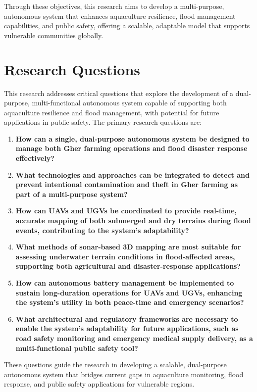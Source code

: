 \documentclass[conference]{IEEEtran}
\begin{document}
Through these objectives, this research aims to develop a multi-purpose, autonomous system that enhances aquaculture resilience, flood management capabilities, and public safety, offering a scalable, adaptable model that supports vulnerable communities globally.

\section{\textbf{Research Questions}}
This research addresses critical questions that explore the development of a dual-purpose, multi-functional autonomous system capable of supporting both aquaculture resilience and flood management, with potential for future applications in public safety. The primary research questions are:
\begin{enumerate}
	\item \textbf{How can a single, dual-purpose autonomous system be designed to manage both Gher farming operations and flood disaster response effectively?}
	\item \textbf{What technologies and approaches can be integrated to detect and prevent intentional contamination and theft in Gher farming as part of a multi-purpose system?}
	\item \textbf{How can UAVs and UGVs be coordinated to provide real-time, accurate mapping of both submerged and dry terrains during flood events, contributing to the system’s adaptability?}
	\item \textbf{What methods of sonar-based 3D mapping are most suitable for assessing underwater terrain conditions in flood-affected areas, supporting both agricultural and disaster-response applications?}
	\item \textbf{How can autonomous battery management be implemented to sustain long-duration operations for UAVs and UGVs, enhancing the system's utility in both peace-time and emergency scenarios?}
	\item \textbf{What architectural and regulatory frameworks are necessary to enable the system’s adaptability for future applications, such as road safety monitoring and emergency medical supply delivery, as a multi-functional public safety tool?}
\end{enumerate}

These questions guide the research in developing a scalable, dual-purpose autonomous system that bridges current gaps in aquaculture monitoring, flood response, and public safety applications for vulnerable regions.
\end{document}
